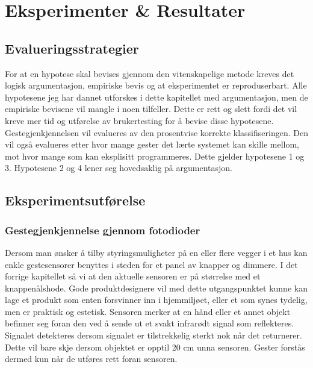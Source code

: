 \section[Eksperimenter \& Resultater]{Eksperimenter \& Resultater}
\subsection{Evalueringsstrategier}
For at en hypotese skal bevises gjennom den vitenskapelige metode kreves det logisk argumentasjon, empiriske bevis og at eksperimentet er reproduserbart. Alle hypotesene jeg har dannet utforskes i dette kapitellet med argumentasjon, men de empiriske bevisene vil mangle i noen tilfeller. Dette er rett og slett fordi det vil kreve mer tid og utførelse av brukertesting for å bevise disse hypotesene. Gestegjenkjennelsen vil evalueres av den prosentvise korrekte klassifiseringen. Den vil også evalueres etter hvor mange gester det lærte systemet kan skille mellom, mot hvor mange som kan eksplisitt programmeres. Dette gjelder hypotesene 1 og 3. Hypotesene 2 og 4 lener seg hovedsaklig på argumentasjon.\\

\subsection{Eksperimentsutførelse}
\subsubsection*{Gestegjenkjennelse gjennom fotodioder}
Dersom man ønsker å tilby styringsmuligheter på en eller flere vegger i et hus kan enkle gestesensorer benyttes i steden for et panel av knapper og dimmere. I det forrige kapitellet så vi at den aktuelle sensoren er på størrelse med et knappenålshode. Gode produktdesignere vil med dette utgangspunktet kunne kan lage et produkt som enten forsvinner inn i hjemmiljøet, eller et som synes tydelig, men er praktisk og estetisk. Sensoren merker at en hånd eller et annet objekt befinner seg foran den ved å sende ut et svakt infrarødt signal som reflekteres. Signalet detekteres dersom signalet er tilstrekkelig sterkt nok når det returnerer. Dette vil bare skje dersom objektet er opptil 20 cm unna sensoren. Gester forstås dermed kun når de utføres rett foran sensoren.

